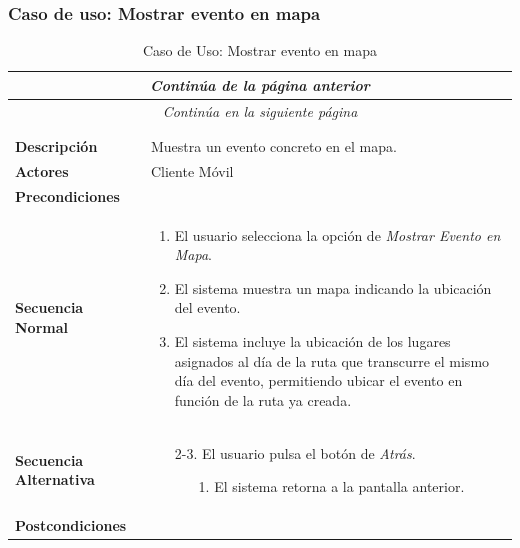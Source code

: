 \subsubsection*{Caso de uso: Mostrar evento en mapa }
\begin{longtable}{| p{4cm} | p{10cm} |}
\endfirsthead
\multicolumn{2}{c}{\textit{Continúa de la página anterior}}\\[12pt]
\hline
\endhead
\hline
\multicolumn{2}{c}{\textit{Continúa en la siguiente página}} \\
\endfoot
\hline
\caption{Caso de Uso: Mostrar evento en mapa}\label{fig:1}\\
\endlastfoot


\hline
\multicolumn{2}{|c|}{\textbf{CU$<$11$>$ - Mostrar Evento en Mapa}} \\

\hline
\textbf{Descripción} &
Muestra un evento concreto en el mapa.\\

\hline
\textbf{Actores} &
Cliente Móvil\\

\hline
\textbf{Precondiciones} &
\\

\hline
\textbf{Secuencia Normal} &\mbox{}\par\vspace{-\baselineskip}
\begin{enumerate}[leftmargin=0.7cm, topsep=0.1cm]
\item El usuario selecciona la opción de \textit{Mostrar Evento en Mapa}.
\item El sistema muestra un mapa indicando la ubicación del evento.
\item El sistema incluye la ubicación de los lugares asignados al día de la ruta que transcurre el mismo día del evento, permitiendo ubicar el evento en función de la ruta ya creada.
\end{enumerate}
\\
\hline
\textbf{Secuencia Alternativa} &\mbox{}\par\vspace{-\baselineskip}
\begin{enumerate}[leftmargin=0.9cm, topsep=0.1cm]
\item[2-3.] El usuario pulsa el botón de \textit{Atrás}.
	\begin{itemize}
	\item[1.] El sistema retorna a la pantalla anterior.
	\end{itemize}
\end{enumerate}
\\

\hline
\textbf{Postcondiciones} & \\
\hline
\end{longtable}




